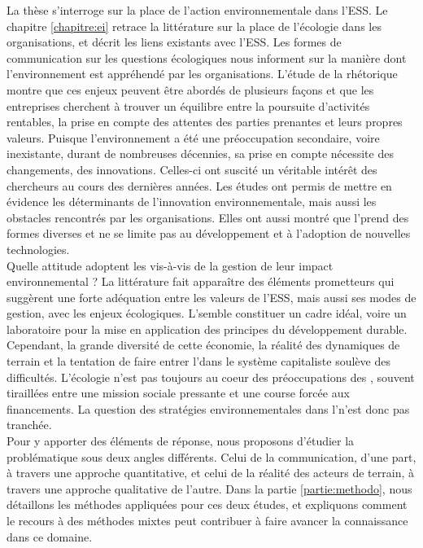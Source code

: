 La thèse s'interroge sur la place de l'action environnementale dans l'ESS. Le chapitre \ref{chapitre:ei} retrace la littérature sur la place de l'écologie dans les organisations, et décrit les liens existants avec l'ESS. Les formes de communication sur les questions écologiques nous informent sur la manière dont l'environnement est appréhendé par les organisations. L'étude de la rhétorique montre que ces enjeux peuvent être abordés de plusieurs façons et que les entreprises cherchent à trouver un équilibre entre la poursuite d'activités rentables, la prise en compte des attentes des parties prenantes et leurs propres valeurs. Puisque l'environnement a été une préoccupation secondaire, voire inexistante, durant de nombreuses décennies, sa prise en compte nécessite des changements, des innovations. Celles-ci ont suscité un véritable intérêt des chercheurs au cours des dernières années. Les études ont permis de mettre en évidence les déterminants de l'innovation environnementale, mais aussi les obstacles rencontrés par les organisations. Elles ont aussi montré que l'\ei prend des formes diverses et ne se limite pas au développement et à l'adoption de nouvelles technologies. \\

Quelle attitude adoptent les \eess vis-à-vis de la gestion de leur impact environnemental ? La littérature fait apparaître des éléments prometteurs qui suggèrent une forte adéquation entre les valeurs de l'ESS, mais aussi ses modes de gestion, avec les enjeux écologiques. L'\ess semble constituer un cadre idéal, voire un laboratoire pour la mise en application des principes du développement durable. Cependant, la grande diversité de cette économie, la réalité des dynamiques de terrain et la tentation de faire entrer l'\ess dans le système capitaliste soulève des difficultés. L'écologie n'est pas toujours au coeur des préoccupations des \oess, souvent tiraillées entre une mission sociale pressante et une course forcée aux financements. La question des stratégies environnementales dans l'\ess n'est donc pas tranchée. \\

Pour y apporter des éléments de réponse, nous proposons d'étudier la problématique sous deux angles différents. Celui de la communication, d'une part, à travers une approche quantitative, et celui de la réalité des acteurs de terrain, à travers une approche qualitative de l'autre. Dans la partie \ref{partie:methodo}, nous détaillons les méthodes appliquées pour ces deux études, et expliquons comment le recours à des méthodes mixtes peut contribuer à faire avancer la connaissance dans ce domaine. 
